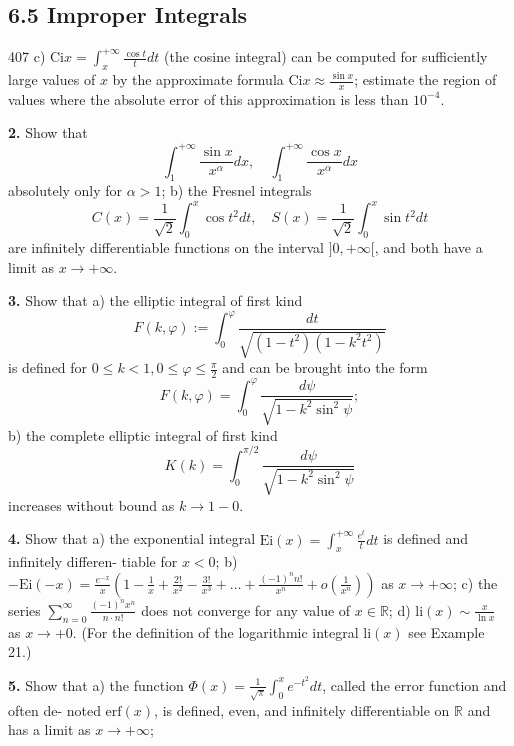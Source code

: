 \subsection{6.5 Improper Integrals}
\hfill 407
\medskip
c) $\text{Ci}x = \int_{x}^{+\infty} \frac{\cos t}{t} dt$ (the cosine integral) can be computed for sufficiently
large values of $x$ by the approximate formula $\text{Ci}x \approx \frac{\sin x}{x}$; estimate the region of
values where the absolute error of this approximation is less than $10^{-4}$.

\textbf{2.} Show that
$$
\int_{1}^{+\infty} \frac{\sin x}{x^\alpha} dx, \quad \int_{1}^{+\infty} \frac{\cos x}{x^\alpha} dx
$$
absolutely only for $\alpha > 1$;
b) the Fresnel integrals
$$
C(x)= \frac{1}{\sqrt{2}} \int_{0}^{x} \cos t^2 dt, \quad S(x)= \frac{1}{\sqrt{2}} \int_{0}^{x} \sin t^2 dt
$$
are infinitely differentiable functions on the interval $]0, +\infty[$, and both have a limit
as $x \to +\infty$.

\textbf{3.} Show that
a) the elliptic integral of first kind
$$
F(k, \varphi) := \int_{0}^{\varphi} \frac{dt}{\sqrt{(1-t^2)(1-k^2t^2)}}
$$
is defined for $0 \le k < 1, 0 \le \varphi \le \frac{\pi}{2}$ and can be brought into the form
$$
F(k, \varphi) = \int_{0}^{\varphi} \frac{d\psi}{\sqrt{1-k^2 \sin^2 \psi}};
$$
b) the complete elliptic integral of first kind
$$
K(k) = \int_{0}^{\pi/2} \frac{d\psi}{\sqrt{1-k^2 \sin^2 \psi}}
$$
increases without bound as $k \to 1-0$.

\textbf{4.} Show that
a) the exponential integral $\text{Ei}(x) = \int_{x}^{+\infty} \frac{e^t}{t} dt$ is defined and infinitely differen-
tiable for $x < 0$;
b) $-\text{Ei}(-x) = \frac{e^{-x}}{x} \left(1 - \frac{1}{x} + \frac{2!}{x^2} - \frac{3!}{x^3} + \dots + \frac{(-1)^n n!}{x^n} + o\left(\frac{1}{x^n}\right)\right)$ as $x \to +\infty$;
c) the series $\sum_{n=0}^{\infty} \frac{(-1)^n x^n}{n \cdot n!}$ does not converge for any value of $x \in \mathbb{R}$;
d) $\text{li}(x) \sim \frac{x}{\ln x}$ as $x \to +0$. (For the definition of the logarithmic integral $\text{li}(x)$
see Example 21.)

\textbf{5.} Show that
a) the function $\Phi(x) = \frac{1}{\sqrt{\pi}} \int_{0}^{x} e^{-t^2} dt$, called the error function and often de-
noted $\text{erf}(x)$, is defined, even, and infinitely differentiable on $\mathbb{R}$ and has a limit as
$x \to +\infty$;